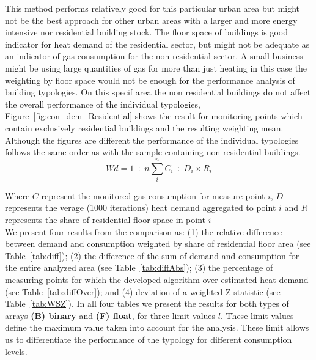 \documentclass[authoryear,preprint,review,12pt]{elsarticle}
\begin{document}
\begin{linenumbers}
This method performs relatively good for this particular urban area but might
not be the best approach for other urban areas with a larger and more energy
intensive nor residential building stock. The floor space of buildings is good
indicator for heat demand of the residential sector, but might not be adequate
as an indicator of gas consumption for the non residential sector. A small
business might be using large quantities of gas for more than just heating in
this case the weighting by floor space would not be enough for the performance
analysis of building typologies. On this specif area the non residential
buildings do not affect the overall performance of the individual typologies,
Figure~\ref{fig:con_dem_Residential} shows the result for monitoring points
which contain exclusively residential buildings and the resulting weighting
mean. Although the figures are different the performance of the individual
typologies follows the same order as with the sample containing non residential
buildings.\\ 

\begin{equation} \label{eq:diff}
Wd = 1 \div n \sum_i^n C_i \div D_i \times R_i
\end{equation} 

Where
$C$ represent the  monitored gas consumption for measure point $i$, 
$D$ represents the verage (1000 iterations) heat demand aggregated to point
$i$ and $R$ represents the share of residential floor space in point
$i$\\

We present four results from the comparison as: (1) the relative
difference between demand and consumption weighted by share of residential floor
area (see Table~\ref{tab:diff}); (2) the difference of the sum of demand and
consumption for the entire analyzed area (see Table~\ref{tab:diffAbs}); (3) the
percentage of measuring points for which the developed algorithm over estimated
heat demand (see Table~\ref{tab:diffOver}); and (4) deviation of a weighted
Z-statistic (see Table~\ref{tab:WSZ}).  In all four tables we present the
results for both types of arrays \textbf{(B) binary} and \textbf{(F) float},
for three limit values $l$. These limit values define the maximum value taken
into account for the analysis. These limit allows us to differentiate the
performance of the typology for different consumption levels.\\


\end{linenumbers}
\end{document}
